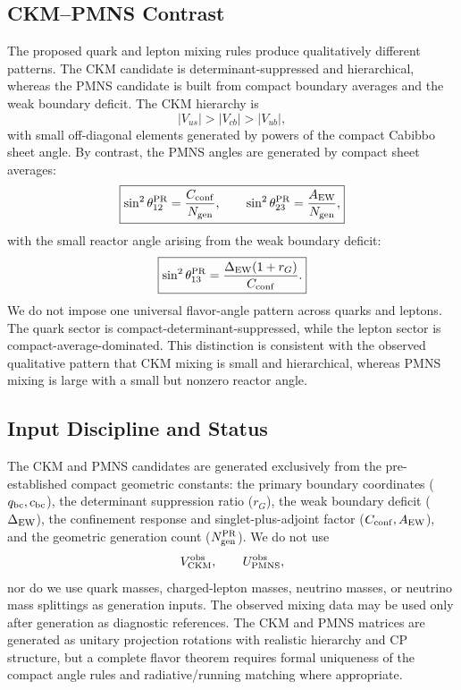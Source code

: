\documentclass[11pt]{article}
\begin{document}
\subsection{CKM--PMNS Contrast}
\label{sec:pr2_ckm_pmns_contrast}
The proposed quark and lepton mixing rules produce qualitatively different patterns. The CKM candidate is determinant-suppressed and hierarchical, whereas the PMNS candidate is built from compact boundary averages and the weak boundary deficit. The CKM hierarchy is
\begin{equation}
|V_{us}|>|V_{cb}|>|V_{ub}|,
\end{equation}
with small off-diagonal elements generated by powers of the compact Cabibbo sheet angle. By contrast, the PMNS angles are generated by compact sheet averages:
\begin{equation}
\boxed{
\sin^2\theta_{12}^{\rm PR}
=
\frac{C_{\rm conf}}{N_{\rm gen}},
\qquad
\sin^2\theta_{23}^{\rm PR}
=
\frac{A_{\rm EW}}{N_{\rm gen}},
}
\end{equation}
with the small reactor angle arising from the weak boundary deficit:
\begin{equation}
\boxed{
\sin^2\theta_{13}^{\rm PR}
=
\frac{
\Delta_{\rm EW}(1+r_G)
}{
C_{\rm conf}
}.
}
\end{equation}
We do not impose one universal flavor-angle pattern across quarks and leptons. The quark sector is compact-determinant-suppressed, while the lepton sector is compact-average-dominated. This distinction is consistent with the observed qualitative pattern that CKM mixing is small and hierarchical,
whereas PMNS mixing is large with a small but nonzero reactor angle.

\subsection{Input Discipline and Status}
\label{sec:pr2_ckm_pmns_input_discipline_status}

The CKM and PMNS candidates are generated exclusively from the pre-established compact geometric constants: the primary boundary coordinates (\(q_{\rm bc}, c_{\rm bc}\)), the determinant suppression ratio (\(r_G\)), the weak boundary deficit (\(\Delta_{\rm EW}\)), the confinement response and singlet-plus-adjoint factor (\(C_{\rm conf}, A_{\rm EW}\)), and the geometric generation count (\(N_{\rm gen}^{\rm PR}\)). We do not use
\begin{equation}
V_{\rm CKM}^{\rm obs},
\qquad
U_{\rm PMNS}^{\rm obs},
\end{equation}
nor do we use quark masses, charged-lepton masses, neutrino masses, or neutrino mass splittings as generation inputs. The observed mixing data \cite{PDG2024} may be used only after generation as diagnostic references. The CKM and PMNS matrices are generated as unitary projection rotations with realistic hierarchy and CP structure, but a complete flavor theorem requires formal uniqueness of the compact angle rules and radiative/running matching where appropriate.
\end{document}
